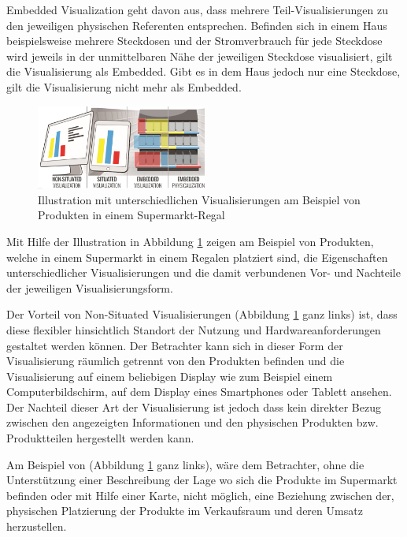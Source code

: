 Embedded Visualization geht davon aus, dass mehrere Teil-Visualisierungen zu den jeweiligen physischen Referenten entsprechen. Befinden sich in einem Haus beispielsweise mehrere Steckdosen und der Stromverbrauch 
für jede Steckdose wird jeweils in der unmittelbaren Nähe der jeweiligen Steckdose visualisiert, gilt die Visualisierung als Embedded. Gibt es in dem Haus jedoch nur eine Steckdose, gilt die Visualisierung nicht mehr als
Embedded.

\vspace{15mm} 
\begin{figure}[H]
	\centering
	\includegraphics[width=0.5\textwidth]{resources/fundamentals/situated_visualization/Illustration_situated_embedded_visualization.png}
	\caption{Illustration mit unterschiedlichen Visualisierungen am Beispiel von Produkten in einem Supermarkt-Regal}
	\label{img:Illustration_situated_embedded_visualization}
\end{figure}

Mit Hilfe der Illustration in Abbildung \ref{img:Illustration_situated_embedded_visualization} zeigen \cite{Willett2017} am Beispiel von Produkten, 
welche in einem Supermarkt in einem Regalen platziert sind, die Eigenschaften unterschiedlicher Visualisierungen und die damit verbundenen Vor- und Nachteile der jeweiligen Visualisierungsform. 

Der Vorteil von Non-Situated Visualisierungen (Abbildung \ref{img:Illustration_situated_embedded_visualization} ganz links) ist, dass diese flexibler hinsichtlich Standort 
der Nutzung und Hardwareanforderungen gestaltet werden können. Der Betrachter kann sich in dieser Form der Visualisierung räumlich getrennt von den Produkten befinden und die Visualisierung 
auf einem beliebigen Display wie zum Beispiel einem Computerbildschirm, auf dem Display eines Smartphones oder Tablett ansehen. Der Nachteil dieser Art der Visualisierung ist jedoch dass kein 
direkter Bezug zwischen den angezeigten Informationen und den physischen Produkten bzw. Produktteilen hergestellt werden kann. 

Am Beispiel von (Abbildung \ref{img:Illustration_situated_embedded_visualization} ganz links), wäre dem Betrachter, ohne die Unterstützung einer Beschreibung der Lage wo sich die Produkte im 
Supermarkt befinden oder mit Hilfe einer Karte, nicht möglich, eine Beziehung zwischen der, physischen Platzierung der Produkte im Verkaufsraum und deren Umsatz herzustellen.

